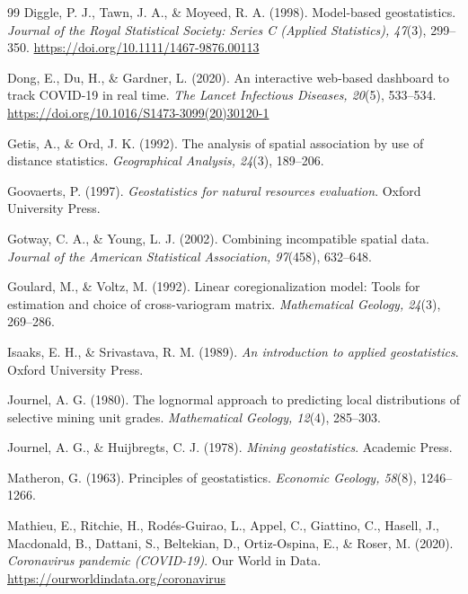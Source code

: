 \documentclass[12pt,a4paper]{article}
\begin{document}
\begin{thebibliography}{99}
 Diggle, P. J., Tawn, J. A., \& Moyeed, R. A. (1998). Model-based geostatistics. \emph{Journal of the Royal Statistical Society: Series C (Applied Statistics), 47}(3), 299--350. \url{https://doi.org/10.1111/1467-9876.00113}

 Dong, E., Du, H., \& Gardner, L. (2020). An interactive web-based dashboard to track COVID-19 in real time. \emph{The Lancet Infectious Diseases, 20}(5), 533--534. \url{https://doi.org/10.1016/S1473-3099(20)30120-1}

 Getis, A., \& Ord, J. K. (1992). The analysis of spatial association by use of distance statistics. \emph{Geographical Analysis, 24}(3), 189--206.

 Goovaerts, P. (1997). \emph{Geostatistics for natural resources evaluation}. Oxford University Press.

 Gotway, C. A., \& Young, L. J. (2002). Combining incompatible spatial data. \emph{Journal of the American Statistical Association, 97}(458), 632--648.

 Goulard, M., \& Voltz, M. (1992). Linear coregionalization model: Tools for estimation and choice of cross-variogram matrix. \emph{Mathematical Geology, 24}(3), 269--286.

 Isaaks, E. H., \& Srivastava, R. M. (1989). \emph{An introduction to applied geostatistics}. Oxford University Press.

 Journel, A. G. (1980). The lognormal approach to predicting local distributions of selective mining unit grades. \emph{Mathematical Geology, 12}(4), 285--303.

 Journel, A. G., \& Huijbregts, C. J. (1978). \emph{Mining geostatistics}. Academic Press.

 Matheron, G. (1963). Principles of geostatistics. \emph{Economic Geology, 58}(8), 1246--1266.

 Mathieu, E., Ritchie, H., Rodés-Guirao, L., Appel, C., Giattino, C., Hasell, J., Macdonald, B., Dattani, S., Beltekian, D., Ortiz-Ospina, E., \& Roser, M. (2020). \emph{Coronavirus pandemic (COVID-19)}. Our World in Data. \url{https://ourworldindata.org/coronavirus}


\end{thebibliography}
\end{document}
